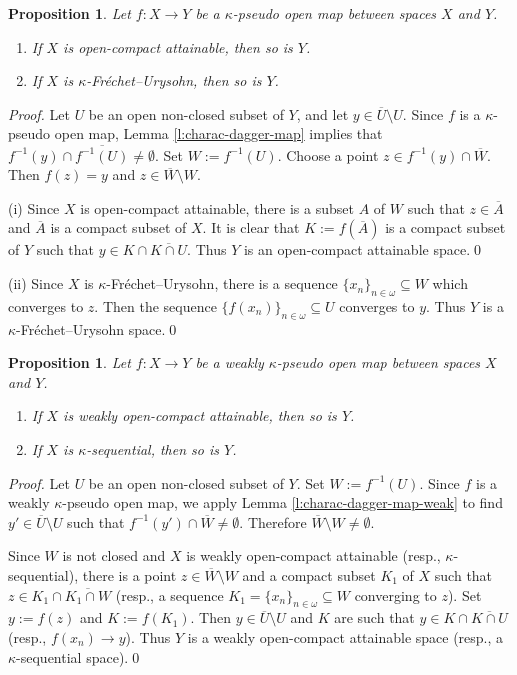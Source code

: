 \documentclass[preprint,11pt]{elsarticle}
\def\dag-{$\kappa$-pseudo open }
\newtheorem{proposition}[theorem]{Proposition}
\numberwithin{equation}{section}
\numberwithin{theorem}{section}
\newcommand{\w}{\omega}
\newcommand{\SM}{{\setminus}}
\begin{document}
\begin{proposition}  \label{p:quot-oca}
Let $f:X\to Y$ be a \dag-map between spaces $X$ and $Y$.
\begin{enumerate}
\item[{\rm(i)}] If $X$ is open-compact attainable, then so is $Y$.
\item[{\rm(ii)}]  If $X$ is $\kappa$-Fr\'{e}chet--Urysohn, then so is $Y$.
\end{enumerate}
\end{proposition}

\begin{proof}
Let $U$ be an open non-closed subset of $Y$, and let $y\in \overline{U}\SM U$. Since $f$ is a  $\kappa$-pseudo open map, Lemma \ref{l:charac-dagger-map} implies that $f^{-1}(y)\cap \overline{f^{-1}(U)}\not=\emptyset$. Set $W:=f^{-1}(U)$. Choose a point $z\in f^{-1}(y)\cap \overline{W}$. Then  $f(z)=y$ and  $z\in\overline{W}\SM W$.
\smallskip

(i) Since $X$ is open-compact attainable, there is a subset $A$ of $W$ such that $z\in \overline{A}$ and $\overline{A}$ is a compact subset of $X$. It is clear that $K:=f(\overline{A})$ is a compact subset of $Y$ such that $y\in K\cap \overline{K\cap U}$. Thus $Y$ is an open-compact attainable space.\qed
\smallskip

(ii)  Since $X$ is  $\kappa$-Fr\'{e}chet--Urysohn, there is a sequence $\{x_n\}_{n\in\w}\subseteq W$ which converges to $z$. Then the sequence $\{f(x_n)\}_{n\in\w}\subseteq U$ converges to $y$. Thus $Y$ is a  $\kappa$-Fr\'{e}chet--Urysohn space.\qed
\end{proof}

\begin{proposition}  \label{p:quotient-woca}
Let $f:X\to Y$ be a weakly  $\kappa$-pseudo open map between spaces $X$ and $Y$.
\begin{enumerate}
\item[{\rm(i)}] If $X$ is weakly open-compact attainable, then so is $Y$.
\item[{\rm(ii)}]  If $X$ is $\kappa$-sequential, then so is $Y$.
\end{enumerate}
\end{proposition}


\begin{proof}
Let $U$ be an open non-closed subset of $Y$. Set $W:=f^{-1}(U)$. Since $f$ is a weakly  $\kappa$-pseudo open map, we apply Lemma \ref{l:charac-dagger-map-weak} to find  $y'\in \overline{U}\SM U$ such that $f^{-1}(y')\cap \overline{W}\not=\emptyset$. Therefore $\overline{W}\SM W\not=\emptyset$.
\smallskip

Since $W$ is not closed and $X$ is weakly open-compact attainable (resp., $\kappa$-sequential), there is a point $z\in\overline{W}\SM W$ and a compact subset $K_1$ of $X$ such that $z\in K_1\cap \overline{K_1\cap W}$  (resp., a sequence $K_1=\{x_n\}_{n\in\w}\subseteq W$ converging to $z$). Set $y:=f(z)$ and $K:=f(K_1)$. Then $y\in \overline{U}\SM U$ and $K$ are such that $y\in K\cap \overline{K\cap U}$ (resp., $f(x_n)\to y$). Thus $Y$ is a weakly open-compact attainable space (resp., a $\kappa$-sequential space).\qed
\end{proof}
\end{document}
